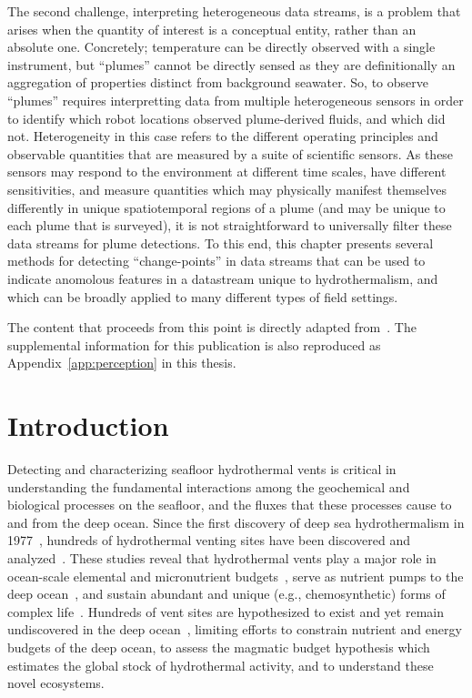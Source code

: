 The second challenge, interpreting heterogeneous data streams, is a problem that arises when the quantity of interest is a conceptual entity, rather than an absolute one. Concretely; temperature can be directly observed with a single instrument, but ``plumes'' cannot be directly sensed as they are definitionally an aggregation of properties distinct from background seawater. So, to observe ``plumes'' requires interpretting data from multiple heterogeneous sensors in order to identify which robot locations observed plume-derived fluids, and which did not. Heterogeneity in this case refers to the different operating principles and observable quantities that are measured by a suite of scientific sensors. As these sensors may respond to the environment at different time scales, have different sensitivities, and measure quantities which may physically manifest themselves differently in unique spatiotemporal regions of a plume (and may be unique to each plume that is surveyed), it is not straightforward to universally filter these data streams for plume detections. To this end, this chapter presents several methods for detecting ``change-points'' in data streams that can be used to indicate anomolous features in a datastream unique to hydrothermalism, and which can be broadly applied to many different types of field settings.

The content that proceeds from this point is directly adapted from~\cite{preston2022discovering}. The supplemental information for this publication is also reproduced as Appendix~\ref{app:perception} in this thesis.


\section{Introduction}
Detecting and characterizing seafloor hydrothermal vents is critical in understanding the fundamental interactions among the geochemical and biological processes on the seafloor, and the fluxes that these processes cause to and from the deep ocean. Since the first discovery of deep sea hydrothermalism in 1977~\autocite{corliss1979submarine}, hundreds of hydrothermal venting sites have been discovered and analyzed~\autocite{beaulieu2015undiscovered}. These studies reveal that hydrothermal vents play a major role in ocean-scale elemental and micronutrient budgets~\autocite{le2019hydrothermal,resing2015basin}, serve as nutrient pumps to the deep ocean~\autocite{dick2013microbiology, vic2018dispersion, scholz2019shelf, bell2017hydrothermal}, and sustain abundant and unique (e.g., chemosynthetic) forms of complex life~\autocite{grassle1987ecology, georgieva2021history}. Hundreds of vent sites are hypothesized to exist and yet remain undiscovered in the deep ocean~\autocite{beaulieu2015undiscovered}, limiting efforts to constrain nutrient and energy budgets of the deep ocean, to assess the magmatic budget hypothesis which estimates the global stock of hydrothermal activity, and to understand these novel ecosystems.  

